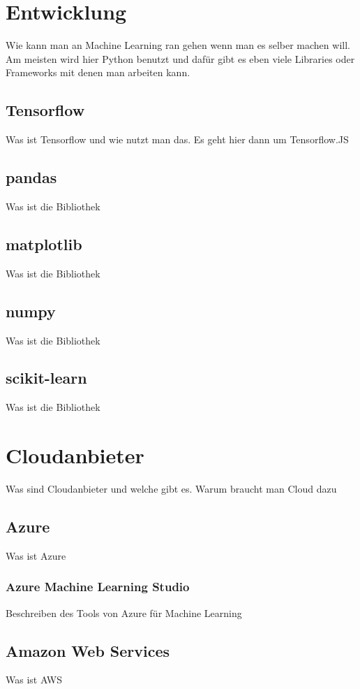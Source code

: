 \section{Entwicklung}
Wie kann man an Machine Learning ran gehen wenn man es selber machen will.
Am meisten wird hier Python benutzt und dafür gibt es eben viele Libraries oder Frameworks mit denen man arbeiten kann.

\subsection{Tensorflow}
Was ist Tensorflow und wie nutzt man das. Es geht hier dann um Tensorflow.JS

\subsection{pandas}
Was ist die Bibliothek

\subsection{matplotlib}
Was ist die Bibliothek

\subsection{numpy}
Was ist die Bibliothek

\subsection{scikit-learn}
Was ist die Bibliothek

\section{Cloudanbieter}
Was sind Cloudanbieter und welche gibt es. Warum braucht man Cloud dazu

\subsection{Azure}
Was ist Azure

\subsubsection{Azure Machine Learning Studio}
Beschreiben des Tools von Azure für Machine Learning

\subsection{Amazon Web Services}
Was ist AWS

